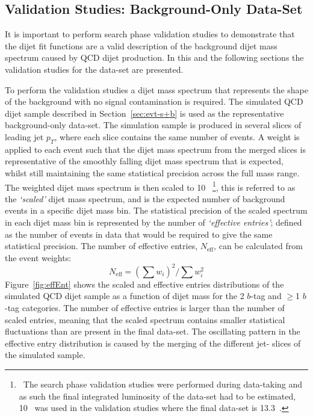 \subsection{Validation Studies: Background-Only Data-Set}
\label{sec:bkg-summer_fitCR}

It is important to perform search phase validation studies to demonstrate
that the dijet fit functions are a valid description of the background dijet mass spectrum caused by QCD dijet production.
In this and the following sections the validation studies for the \summer{} data-set are presented.

To perform the validation studies a dijet mass spectrum that represents the shape of the background with no signal contamination is required.
The simulated QCD dijet sample described in Section~\ref{sec:evt-s+b} is used as the representative background-only data-set.
The simulation sample is produced in several slices of leading jet $p_{T}$, where each slice contains the same number of events.
A weight is applied to each event such that the dijet mass spectrum from the merged slices is representative of the smoothly falling dijet mass spectrum that is expected,
whilst still maintaining the same statistical precision across the full mass range.
The weighted dijet mass spectrum is then scaled to 10~\ifb{}
\footnote{
  \ The search phase validation studies were performed during data-taking
  and as such the final integrated luminosity of the data-set had to be estimated,
  10~\ifb{} was used in the validation studies where the final data-set is 13.3~\ifb{}.
},
this is referred to as the \textit{`scaled'} dijet mass spectrum, and is the expected number of background events in a specific dijet mass bin. 
The statistical precision of the scaled spectrum in each dijet mass bin is represented by the number of \textit{`effective entries'};
defined as the number of events in data that would be required to give the same statistical precision.
The number of effective entries, $N_{\text{eff}}$, can be calculated from the event weights:
\begin{equation}
  N_{\text{eff}} = (\sum{w_i})^2 / \sum{w_i^2}
  \label{eq:effEnt}
\end{equation}
Figure~\ref{fig:effEnt} shows the scaled and effective entries distributions of the simulated QCD dijet sample
as a function of dijet mass for the 2 $b$-tag and $\geq$1 $b$-tag categories.
The number of effective entries is larger than the number of scaled entries,
meaning that the scaled spectrum contains smaller statistical fluctuations than are present in the final data-set.
The oscillating pattern in the effective entry distribution is caused by the merging of the different jet-\pT{} slices of the simulated sample. 

